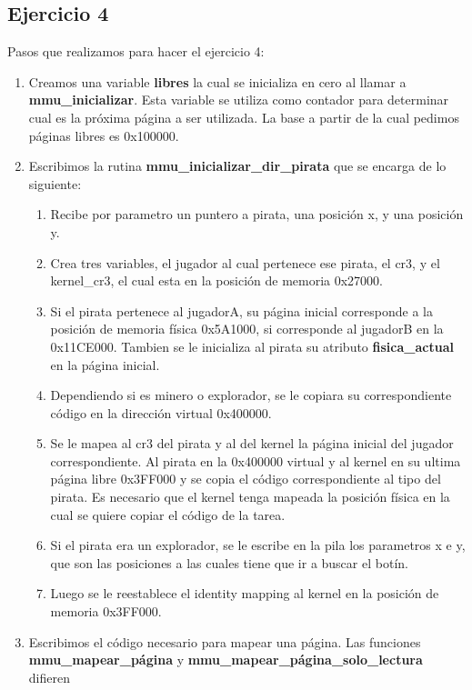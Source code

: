 \documentclass[a4paper,10pt]{article}
\begin{document}
\subsection{Ejercicio 4}
Pasos que realizamos para hacer el ejercicio 4:
\begin{enumerate}
  \item Creamos una variable \textbf{libres} la cual se inicializa en cero al llamar a \textbf{mmu\_inicializar}. Esta variable se utiliza como
    contador para determinar cual es la próxima página a ser utilizada. La base a partir de la cual pedimos páginas libres es 0x100000. 
  \item Escribimos la rutina \textbf{mmu\_inicializar\_dir\_pirata} que se encarga de lo siguiente:
    \begin{enumerate}
      \item Recibe por parametro un puntero a pirata, una posición x, y una posición y.
      \item Crea tres variables, el jugador al cual pertenece ese pirata, el cr3, y el kernel\_cr3, el cual esta en la posición de memoria 0x27000.
      \item Si el pirata pertenece al jugadorA, su página inicial corresponde a la posición de memoria física 0x5A1000, 
        si corresponde al jugadorB en la 0x11CE000. Tambien se le inicializa al pirata su atributo
        \textbf{fisica\_actual} en la página inicial.
      \item Dependiendo si es minero o explorador, se le copiara su correspondiente código en la dirección virtual 0x400000.
      \item Se le mapea al cr3 del pirata y al del kernel la página inicial del jugador correspondiente. Al pirata en la 0x400000 virtual y al kernel
        en su ultima página libre 0x3FF000 y se copia el código correspondiente al tipo del pirata. Es necesario que el kernel tenga mapeada la posición física en la cual se quiere copiar el código de la tarea.
      \item Si el pirata era un explorador, se le escribe en la pila los parametros x e y, que son las posiciones a las cuales tiene que ir a buscar el botín.
      \item Luego se le reestablece el identity mapping al kernel en la posición de memoria 0x3FF000.
    \end{enumerate}
    \item Escribimos el código necesario para mapear una página. Las funciones \textbf{mmu\_mapear\_página} y \textbf{mmu\_mapear\_página\_solo\_lectura} difieren

\end{enumerate}
\end{document}
